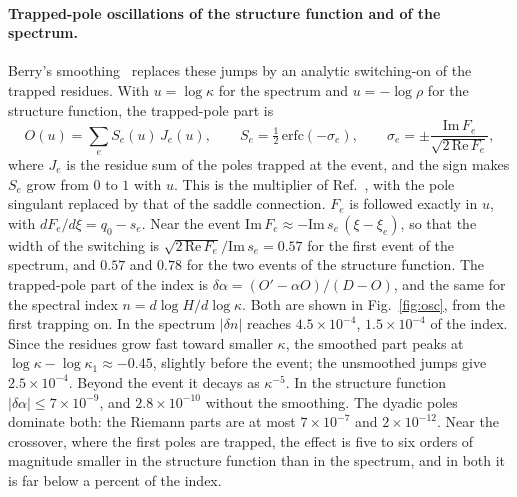 \documentclass[aip,pof,preprint,floatfix,nofootinbib,amsmath,amssymb]{revtex4-2}
\begin{document}
\paragraph*{Trapped-pole oscillations of the structure function and of the spectrum.}
Berry's smoothing~\cite{Berry1988} replaces these jumps by an analytic switching-on of the trapped residues. With
$u=\log\kappa$ for the spectrum and $u=-\log\rho$ for the structure function, the trapped-pole part is
\begin{equation}
    O(u)=\sum_e S_e(u)\,J_e(u),\qquad S_e=\tfrac12\,\mathrm{erfc}(-\sigma_e),\qquad
    \sigma_e=\pm\frac{\mathrm{Im}\,F_e}{\sqrt{2\,\mathrm{Re}\,F_e}},
    \label{eq:Berry}
\end{equation}
where $J_e$ is the residue sum of the poles trapped at the event, and the sign makes $S_e$ grow from $0$ to $1$ with $u$.
This is the multiplier of Ref.~, with the pole singulant replaced by that of the saddle
connection. $F_e$ is followed exactly in $u$, with $dF_e/d\xi=q_0-s_e$. Near the event
$\mathrm{Im}\,F_e\approx-\mathrm{Im}\,s_e\,(\xi-\xi_e)$, so that the width of the switching is
$\sqrt{2\,\mathrm{Re}\,F_e}/\mathrm{Im}\,s_e=0.57$ for the first event of the spectrum, and $0.57$ and $0.78$ for the two
events of the structure function. The trapped-pole part of the index is $\delta\alpha=(O'-\alpha O)/(D-O)$, and the same
for the spectral index $n=d\log H/d\log\kappa$. Both are shown in Fig.~\ref{fig:osc}, from the first trapping on. In the
spectrum $|\delta n|$ reaches $4.5\times10^{-4}$, $1.5\times10^{-4}$ of the index. Since the residues grow fast toward
smaller $\kappa$, the smoothed part peaks at $\log\kappa-\log\kappa_1\approx-0.45$, slightly before the event; the
unsmoothed jumps give $2.5\times10^{-4}$. Beyond the event it decays as $\kappa^{-5}$. In the structure function
$|\delta\alpha|\le7\times10^{-9}$, and $2.8\times10^{-10}$ without the smoothing. The dyadic poles dominate both: the
Riemann parts are at most $7\times10^{-7}$ and $2\times10^{-12}$. Near the crossover, where the first poles are trapped, the
effect is five to six orders of magnitude smaller in the structure function than in the spectrum, and in both it is far
below a percent of the index.
\end{document}
